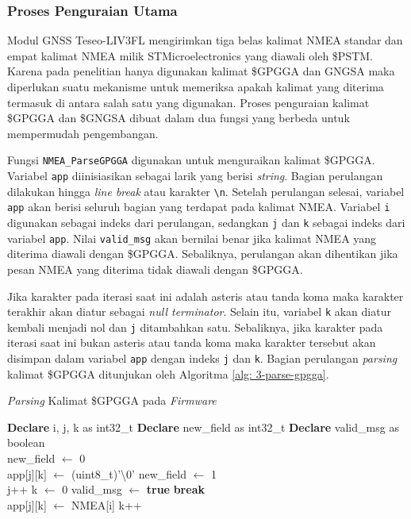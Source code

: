 \subsubsection{Proses Penguraian Utama}
Modul GNSS Teseo\hyp{}LIV3FL mengirimkan tiga belas kalimat NMEA standar dan empat kalimat NMEA milik STMicroelectronics yang diawali oleh \$PSTM. Karena pada penelitian hanya digunakan kalimat \$GPGGA dan GNGSA maka diperlukan suatu mekanisme untuk memeriksa apakah kalimat yang diterima termasuk di antara salah satu yang digunakan. Proses penguraian kalimat \$GPGGA dan \$GNGSA dibuat dalam dua fungsi yang berbeda untuk mempermudah pengembangan. 

Fungsi \texttt{NMEA\_ParseGPGGA} digunakan untuk menguraikan kalimat \$GPGGA. Variabel \texttt{app} diinisiasikan sebagai larik yang berisi \textit{string}. Bagian perulangan dilakukan hingga \textit{line break} atau karakter \texttt{\textbackslash n}. Setelah perulangan selesai, variabel \texttt{app} akan berisi seluruh bagian yang terdapat pada kalimat NMEA. Variabel \texttt{i} digunakan sebagai indeks dari perulangan, sedangkan \texttt{j} dan \texttt{k} sebagai indeks dari variabel \texttt{app}. Nilai \texttt{valid\_msg} akan bernilai benar jika kalimat NMEA yang diterima diawali dengan \$GPGGA. Sebaliknya, perulangan akan dihentikan jika pesan NMEA yang diterima tidak diawali dengan \$GPGGA.

Jika karakter pada iterasi saat ini adalah asteris atau tanda koma maka karakter terakhir akan diatur sebagai \textit{null terminator}. Selain itu, variabel \texttt{k} akan diatur kembali menjadi nol dan \texttt{j} ditambahkan satu. Sebaliknya, jika karakter pada iterasi saat ini bukan asteris atau tanda koma maka karakter tersebut akan disimpan dalam variabel \texttt{app} dengan indeks \texttt{j} dan \texttt{k}. Bagian perulangan \textit{parsing} kalimat \$GPGGA ditunjukan oleh Algoritma \ref{alg: 3-parse-gpgga}.

\begin{algorithm}[H]
	\caption{\textit{Parsing} Kalimat \$GPGGA pada \textit{Firmware}}
	\label{alg: 3-parse-gpgga}
	\begin{algorithmic}[1]
	\State \textbf{Declare} i, j, k as int32\_t
	\State \textbf{Declare} new\_field as int32\_t
	\State \textbf{Declare} valid\_msg as boolean
	\\
		\State new\_field $\gets$ 0
		\\
			\State app[j][k] $\gets$ (uint8\_t)'\textbackslash 0'
			\State new\_field $\gets$ 1
			\\
				\State j++
				\State k $\gets$ 0
				\State valid\_msg $\gets$ \textbf{true}
			\Else
				\State \textbf{break}
			\EndIf
		\EndIf
		\\
			\State app[j][k] $\gets$ NMEA[i]
			\State k++
		\EndIf
	\EndFor
	\\			
	\end{algorithmic}
\end{algorithm}

